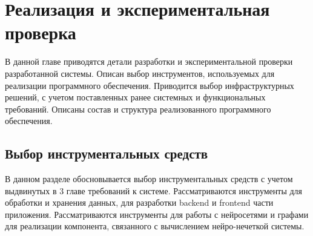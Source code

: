 \chapter{Реализация и экспериментальная проверка}

\begin{annotation}
	В данной главе приводятся детали разработки и экспериментальной проверки
	разработанной системы. Описан выбор инструментов, используемых для реализации
	программного обеспечения. Приводится выбор инфраструктурных решений,
	с учетом поставленных ранее системных и функциональных требований.
	Описаны состав и структура реализованного программного обеспечения.
\end{annotation}




\section{Выбор инструментальных средств}
\begin{annotation}
	В данном разделе обосновывается выбор инструментальных средств с учетом выдвинутых в 3
	главе требований к системе. Рассматриваются инструменты для обработки и хранения данных,
	для разработки backend и frontend части приложения. Рассматриваются инструменты для работы
	с нейросетями и графами для реализации компонента, связанного с вычислением нейро-нечеткой системы.
\end{annotation}


